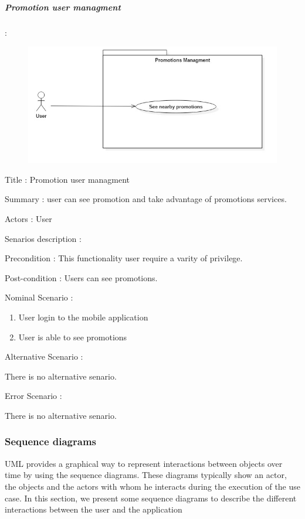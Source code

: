 \subparagraph{Promotion user managment} :
\label{sec:sec01} 

 \begin{figure}[H]
	\centering
	\includegraphics[height=0.3\textheight]{fig01/PromotionUserUseCaseDiagram}
	\label{fig:FilialesEtClients}
\end{figure}

\begin{flushleft}

Title : Promotion user managment

Summary : user can see promotion and take advantage of promotions services.

Actors : User

Senarios description :

Precondition : This functionality user require a varity of privilege.

Post-condition : Users can see promotions.

Nominal Scenario :

 \begin{enumerate}
   \item User login to the mobile application
   \item User is able to see promotions
 \end{enumerate}


Alternative Scenario :

There is no alternative senario.

Error Scenario :

There is no alternative senario.

\end{flushleft}

\newpage
\subsubsection{Sequence diagrams}
\label{sec:sec01}
UML provides a graphical way to represent interactions between objects over time by using the sequence diagrams. These diagrams typically show an actor, the objects and the actors with whom he interacts during the execution of the use case. In this section, we present some sequence diagrams to describe the different interactions between the user and the application


